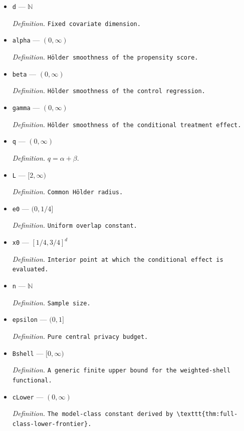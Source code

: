 \documentclass{article}
\begin{document}
\begin{itemize}
  \item \texttt{d} --- \(\mathbb N\)
  \par\smallskip\noindent\emph{Definition.} \texttt{Fixed covariate dimension.}
  \item \texttt{alpha} --- \((0,\infty)\)
  \par\smallskip\noindent\emph{Definition.} \texttt{Hölder smoothness of the propensity score.}
  \item \texttt{beta} --- \((0,\infty)\)
  \par\smallskip\noindent\emph{Definition.} \texttt{Hölder smoothness of the control regression.}
  \item \texttt{gamma} --- \((0,\infty)\)
  \par\smallskip\noindent\emph{Definition.} \texttt{Hölder smoothness of the conditional treatment effect.}
  \item \texttt{q} --- \((0,\infty)\)
  \par\smallskip\noindent\emph{Definition.} \(q=\alpha+\beta\).
  \item \texttt{L} --- \([2,\infty)\)
  \par\smallskip\noindent\emph{Definition.} \texttt{Common Hölder radius.}
  \item \texttt{e0} --- \((0,1/4]\)
  \par\smallskip\noindent\emph{Definition.} \texttt{Uniform overlap constant.}
  \item \texttt{x0} --- \([1/4,3/4]^d\)
  \par\smallskip\noindent\emph{Definition.} \texttt{Interior point at which the conditional effect is evaluated.}
  \item \texttt{n} --- \(\mathbb N\)
  \par\smallskip\noindent\emph{Definition.} \texttt{Sample size.}
  \item \texttt{epsilon} --- \((0,1]\)
  \par\smallskip\noindent\emph{Definition.} \texttt{Pure central privacy budget.}
  \item \texttt{Bshell} --- \([0,\infty)\)
  \par\smallskip\noindent\emph{Definition.} \texttt{A generic finite upper bound for the weighted-\allowbreak{}shell functional.}
  \item \texttt{cLower} --- \((0,\infty)\)
  \par\smallskip\noindent\emph{Definition.} \texttt{The model-\allowbreak{}class constant derived by \textbackslash{}\allowbreak{}texttt\{thm:\allowbreak{}full-\allowbreak{}class-\allowbreak{}lower-\allowbreak{}frontier\}\allowbreak{}.}

\end{itemize}
\end{document}
